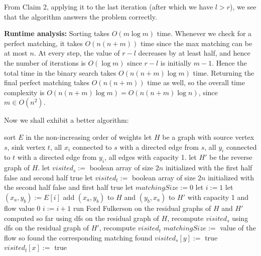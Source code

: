 \documentclass[answers]{exam}
\begin{document}
\begin{questions}
\begin{solution}
    From Claim 2, applying it to the last iteration (after which we have $l > r$), we see that the algorithm answers the problem correctly.

    \textbf{Runtime analysis:}
    Sorting takes $O(m \log m)$ time. Whenever we check for a perfect matching, it takes $O(n(n + m))$ time since the max matching can be at most $n$. At every step, the value of $r - l$ decreases by at least half, and hence the
    number of iterations is $O(\log m)$ since $r - l$ is initially $m - 1$. Hence the total time in the binary search takes $O(n(n + m) \log m)$ time. Returning the final perfect matching takes
    $O(n(n + m))$ time
    as well, so the overall time complexity is $O(n(n + m) \log m) = O(n(n + m) \log n)$, since $m \in O(n^2)$.
\end{solution}

\begin{solution}

    Now we shall exhibit a better algorithm:

    \begin{algorithmic}
            \State sort $E$ in the non-increasing order of weights
            \State let $H$ be a graph with source vertex $s$, sink vertex $t$, all $x_i$ connected to $s$ with a directed edge from $s$, all $y_i$ connected to $t$ with a directed edge from $y_i$,
            all edges with capacity 1.
            \State let $H'$ be the reverse graph of $H$.
            \State let $visited_s := $ boolean array of size $2n$ initialized with the first half false and second half true
            \State let $visited_t := $ boolean array of size $2n$ initialized with the second half false and first half true
            \State let $matchingSize := 0$
            \State let $i := 1$
                \State let $(x_a, y_b) := E[i]$
                \State add $(x_a, y_b)$ to $H$ and $(y_b, x_a)$ to $H'$ with capacity 1 and flow value 0
                \State $i := i + 1$
                    \State run Ford Fulkerson on the residual graphs of $H$ and $H'$ computed so far
                    \State using dfs on the residual graph of $H$, recompute $visited_s$
                    \State using dfs on the residual graph of $H'$, recompute $visited_t$
                    \State $matchingSize := $ value of the flow so found
                        \State \Return the corresponding matching found
                    \EndIf
                    \State $visited_s[y] := $ true
                    \State $visited_t[x] := $ true
                \EndIf
            \EndWhile
        \EndFunction
    \end{algorithmic}


\end{solution}
\end{questions}
\end{document}
